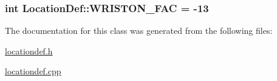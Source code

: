 \subsubsection[{W\+R\+I\+S\+T\+O\+N\+\_\+\+F\+A\+C}]{\setlength{\rightskip}{0pt plus 5cm}int Location\+Def\+::\+W\+R\+I\+S\+T\+O\+N\+\_\+\+F\+A\+C = -\/13\hspace{0.3cm}{\ttfamily [static]}}\label{class_location_def_aacd6614860bbb45c15b17bc57c93bffa}


The documentation for this class was generated from the following files\+:\begin{DoxyCompactItemize}
\item 
\hyperlink{locationdef_8h}{locationdef.\+h}\item 
\hyperlink{locationdef_8cpp}{locationdef.\+cpp}\end{DoxyCompactItemize}
